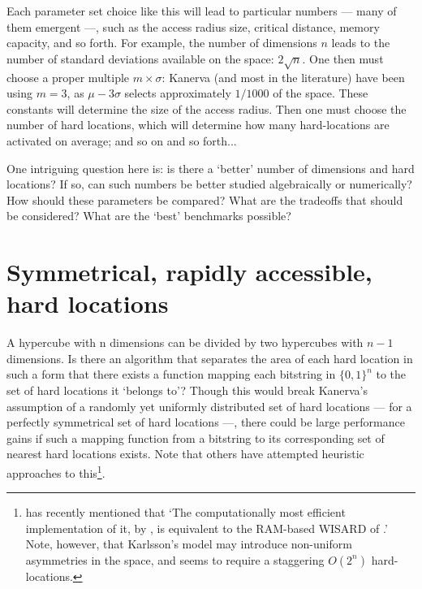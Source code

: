 Each parameter set choice like this will lead to particular numbers --- many of them emergent ---, such as the access radius size, critical distance, memory capacity, and so forth.  For example, the number of dimensions $n$ leads to the number of standard deviations available on the space: $2 \sqrt{n}$.  One then must choose a proper multiple $m\times\sigma$: Kanerva (and most in the literature) have been using $m=3$, as $\mu-3\sigma$ selects approximately $1/1000$ of the space. These constants will determine the size of the access radius.  Then one must choose the number of hard locations, which will determine how many hard-locations are activated on average; and so on and so forth...

One intriguing question here is:  is there a `better' number of dimensions and hard locations?  If so, can such numbers be better studied algebraically or numerically? How should these parameters be compared?  What are the tradeoffs that should be considered?  What are the `best' benchmarks possible?






\section{Symmetrical, rapidly accessible, hard locations}

A hypercube with n dimensions can be divided by two hypercubes with $n-1$ dimensions. Is there an algorithm that separates the area of each hard location in such a form that there exists a function mapping each bitstring in $\{0,1\}^n$ to the set of hard locations it `belongs to'?  Though this would break Kanerva's assumption of a randomly yet uniformly distributed set of hard locations --- for a perfectly symmetrical set of hard locations ---, there could be large performance gains if such a mapping function from a bitstring to its corresponding set of nearest hard locations exists. Note that others have attempted heuristic approaches to this\footnote{\citet{Kanerva2009} has recently mentioned that `The computationally most efficient implementation of it, by \citet{Karlsson95afast}, is equivalent to the RAM-based WISARD of  \citet{aleksander1982computer}.' Note, however, that Karlsson's model may introduce non-uniform asymmetries in the space, and seems to require a staggering $O(2^n)$ hard-locations.}.

